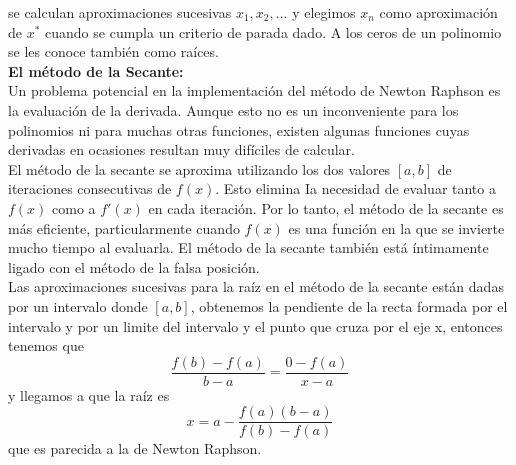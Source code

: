 \documentclass[12pt]{article}
\begin{document}
			se calculan aproximaciones sucesivas $ x_1,x_2,... $ y elegimos $ x_n $ como aproximación de $ x^* $ cuando se cumpla un 
			criterio de parada dado. A los ceros de un polinomio se les conoce también como raíces.\\
			\textbf{El método de la Secante:}\\
			Un problema potencial en la implementación del método de Newton Raphson es la evaluación de 
			la derivada. Aunque esto no es un inconveniente para los polinomios ni para muchas otras 
			funciones, existen algunas funciones cuyas derivadas en ocasiones resultan muy difíciles de calcular. \cite{bib:item3} \\
			El método de la secante se aproxima utilizando los dos valores $[a,b] $ de iteraciones consecutivas 
			de $ f(x)$. Esto elimina Ia necesidad de evaluar tanto a $ f(x) $ como a $ f'(x) $ en cada iteración. 
			Por lo tanto, el método de la secante es más eficiente, particularmente cuando $ f(x) $ es una 
			función en la que se invierte mucho tiempo al evaluarla. El método de la secante también está 
			íntimamente ligado con el método de la falsa posición. \cite{bib:item2} \\
			Las aproximaciones sucesivas para la raíz en el método de la secante están dadas por un intervalo 
			donde $ [a,b] $, obtenemos la pendiente de la recta formada por el intervalo y por un limite del 
			intervalo y el punto que cruza por el eje x, entonces tenemos que $$ \frac{f(b)-f(a)}{b-a} = \frac{0-f(a)}{x-a} $$ 
			y llegamos a que la raíz es $$ x = a - \frac{f(a)(b-a)}{f(b)-f(a)} $$ que es parecida a la de Newton Raphson.
			
\end{document}
